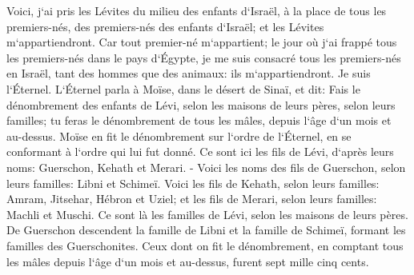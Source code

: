 \verse Voici, j`ai pris les Lévites du milieu des enfants d`Israël, à la place de tous les premiers-nés, des premiers-nés des enfants d`Israël; et les Lévites m`appartiendront. 
\verse Car tout premier-né m`appartient; le jour où j`ai frappé tous les premiers-nés dans le pays d`Égypte, je me suis consacré tous les premiers-nés en Israël, tant des hommes que des animaux: ils m`appartiendront. Je suis l`Éternel. 
\verse L`Éternel parla à Moïse, dans le désert de Sinaï, et dit: 
\verse Fais le dénombrement des enfants de Lévi, selon les maisons de leurs pères, selon leurs familles; tu feras le dénombrement de tous les mâles, depuis l`âge d`un mois et au-dessus. 
\verse Moïse en fit le dénombrement sur l`ordre de l`Éternel, en se conformant à l`ordre qui lui fut donné. 
\verse Ce sont ici les fils de Lévi, d`après leurs noms: Guerschon, Kehath et Merari. - 
\verse Voici les noms des fils de Guerschon, selon leurs familles: Libni et Schimeï. 
\verse Voici les fils de Kehath, selon leurs familles: Amram, Jitsehar, Hébron et Uziel; 
\verse et les fils de Merari, selon leurs familles: Machli et Muschi. Ce sont là les familles de Lévi, selon les maisons de leurs pères. 
\verse De Guerschon descendent la famille de Libni et la famille de Schimeï, formant les familles des Guerschonites. 
\verse Ceux dont on fit le dénombrement, en comptant tous les mâles depuis l`âge d`un mois et au-dessus, furent sept mille cinq cents. 

